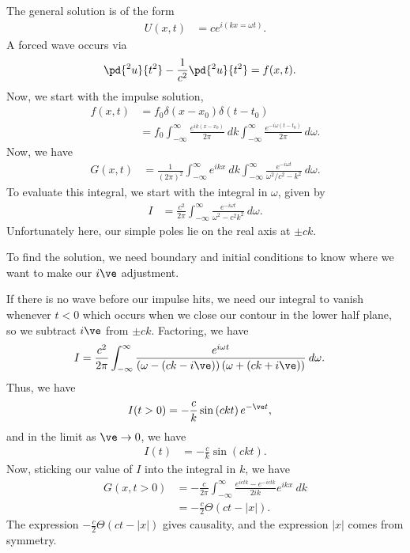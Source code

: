 \documentclass[10pt]{mypackage}
\begin{document}
  The general solution is of the form
  \begin{align*}
    U\left( x,t \right) &= ce^{i\left( kx = \omega t \right)}.
  \end{align*}
  A forced wave occurs via
  \begin{align*}
    \pd{^2u}{t^2} - \frac{1}{c^2} \pd{^2u}{t^2} &= f(x,t).
  \end{align*}
  Now, we start with the impulse solution,
  \begin{align*}
    f(x,t) &= f_0\delta\left( x-x_0 \right)\delta\left( t-t_0 \right)\\
           &= f_0 \int_{-\infty}^{\infty} \frac{e^{ik\left( x-x_0 \right)}}{2\pi}\:dk \int_{-\infty}^{\infty} \frac{e^{-i\omega\left( t-t_0 \right)}}{2\pi}\:d\omega.
  \end{align*}
  Now, we have
  \begin{align*}
    G(x,t) &= \frac{1}{\left( 2\pi \right)^2}\int_{-\infty}^{\infty} e^{ikx}\:dk\int_{-\infty}^{\infty} \frac{e^{-i\omega t}}{\omega^2/c^2 - k^2}\:d\omega.
  \end{align*}
  To evaluate this integral, we start with the integral in $\omega$, given by
  \begin{align*}
    I &= \frac{c^2}{2\pi}\int_{-\infty}^{\infty} \frac{e^{-i\omega t}}{\omega^2 - c^2k^2}\:d\omega.
  \end{align*}
  Unfortunately here, our simple poles lie on the real axis at $\pm ck$.\newline

  To find the solution, we need boundary and initial conditions to know where we want to make our $i\ve$ adjustment.\newline

  If there is no wave before our impulse hits, we need our integral to vanish whenever $t < 0$ which occurs when we close our contour in the lower half plane, so we subtract $i\ve$ from $\pm ck$. Factoring, we have
  \begin{align*}
    I &= \frac{c^2}{2\pi}\int_{-\infty}^{\infty} \frac{e^{i\omega t}}{\left( \omega-\left( ck-i\ve \right) \right)\left( \omega+\left( ck + i\ve\right) \right)}\:d\omega.
  \end{align*}
  Thus, we have
  \begin{align*}
    I(t > 0) &= -\frac{c}{k}\sin\left( ckt \right)e^{-\ve t},
  \end{align*}
  and in the limit as $\ve\rightarrow 0$, we have
  \begin{align*}
    I(t) &= -\frac{c}{k}\sin\left( ckt \right).
  \end{align*}
  Now, sticking our value of $I$ into the integral in $k$, we have
  \begin{align*}
    G\left( x, t> 0 \right) &= -\frac{c}{2\pi} \int_{-\infty}^{\infty} \frac{e^{ictk} - e^{-ictk}}{2ik}e^{ikx}\:dk\\
                            &= -\frac{c}{2}\Theta\left( ct-\left\vert x \right\vert \right).
  \end{align*}
  The expression $-\frac{c}{2}\Theta\left( ct-\left\vert x \right\vert \right)$ gives causality, and the expression $\left\vert x \right\vert$ comes from symmetry.
\end{document}
